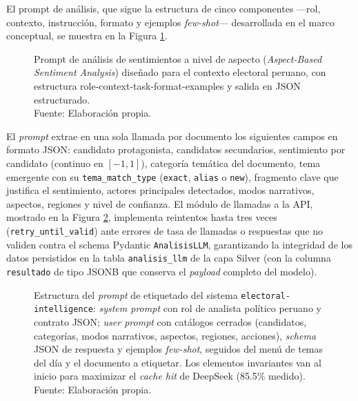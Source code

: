 El prompt de análisis, que sigue la estructura de cinco componentes —rol, contexto,
instrucción, formato y ejemplos \textit{few-shot}— desarrollada en el marco conceptual,
se muestra en la Figura \ref{5:fig16}.

\begin{figure}[!ht]
    \begin{center}
        \resizebox{0.85\textwidth}{!}{}
        \caption[Prompt de análisis de sentimientos a nivel de aspecto para el contexto electoral peruano]{Prompt de análisis de sentimientos a nivel de aspecto (\textit{Aspect-Based Sentiment Analysis}) diseñado para el contexto electoral peruano, con estructura role-context-task-format-examples y salida en JSON estructurado.\\Fuente: Elaboración propia.}
        \label{5:fig16}
    \end{center}
\end{figure}

El \textit{prompt} extrae en una sola llamada por documento los siguientes campos en
formato JSON: candidato protagonista, candidatos secundarios, sentimiento por
candidato (continuo en $[-1, 1]$), categoría temática del documento, tema emergente
con su \texttt{tema\_match\_type} (\texttt{exact}, \texttt{alias} o \texttt{new}),
fragmento clave que justifica el sentimiento, actores principales detectados,
modos narrativos, aspectos, regiones y nivel de confianza. El módulo de llamadas a
la API, mostrado en la Figura \ref{5:fig17}, implementa reintentos hasta tres veces
(\texttt{retry\_until\_valid}) ante errores de tasa de llamadas o respuestas que no
validen contra el schema Pydantic \texttt{AnalisisLLM}, garantizando la integridad
de los datos persistidos en la tabla \texttt{analisis\_llm} de la capa Silver
(con la columna \texttt{resultado} de tipo JSONB que conserva el \textit{payload}
completo del modelo).

\begin{figure}[!ht]
    \begin{center}
        \resizebox{0.85\textwidth}{!}{}
        \caption[Estructura del prompt de etiquetado del sistema electoral-intelligence]{Estructura del \textit{prompt} de etiquetado del sistema \texttt{electoral-intelligence}: \textit{system prompt} con rol de analista político peruano y contrato JSON; \textit{user prompt} con catálogos cerrados (candidatos, categorías, modos narrativos, aspectos, regiones, acciones), \textit{schema} JSON de respuesta y ejemplos \textit{few-shot}, seguidos del menú de temas del día y el documento a etiquetar. Los elementos invariantes van al inicio para maximizar el \textit{cache hit} de DeepSeek (85.5\% medido).\\
            Fuente: Elaboración propia.}
        \label{5:fig17}
    \end{center}
\end{figure}

